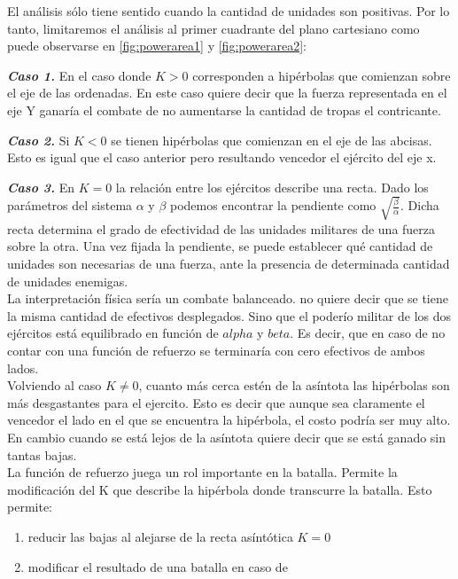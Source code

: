 \documentclass{sig-alternate}
\begin{document}
El an\'alisis s\'olo tiene sentido cuando la cantidad de unidades son positivas. Por lo tanto, limitaremos el an\'alisis al primer cuadrante del plano cartesiano como puede observarse en \ref{fig:powerarea1} y \ref{fig:powerarea2}:


\textbf{\textit{Caso 1.}} En el caso donde $K > 0$ corresponden a hip\'erbolas que comienzan
sobre el eje de las ordenadas. En este caso quiere decir que la fuerza representada
en el eje Y ganar\'ia el combate de no aumentarse la cantidad de tropas
el contricante.


\textbf{\textit{Caso 2.}} Si $K<0$ se tienen hip\'erbolas que comienzan
en el eje de las abcisas. Esto es igual que el caso anterior pero resultando vencedor el ejército del eje x.

\textbf{\textit{Caso 3.}} 
En $K=0$ la relación entre los ejércitos describe una recta. Dado los parámetros del sistema $\alpha$ y $\beta$ podemos encontrar la pendiente como $\sqrt{\frac{\beta}{\alpha}}$. Dicha recta determina el grado de efectividad de las unidades militares de una fuerza sobre la otra. Una vez fijada la pendiente, se puede 
establecer qué cantidad de unidades son necesarias de una fuerza, ante la presencia de determinada cantidad de unidades enemigas.  \\
La interpretación f\'isica ser\'ia un combate balanceado. no quiere decir que se tiene la misma cantidad de efectivos desplegados. Sino que el poderío militar de los dos ej\'ercitos está equilibrado en función de $alpha$ y $beta$. Es decir, que en caso de no contar con una funci\'on de refuerzo se terminar\'ia con cero efectivos de ambos lados. \\
Volviendo al caso $K \ne 0$, cuanto m\'as cerca est\'en de la as\'intota las hip\'erbolas son m\'as desgastantes para el ejercito. Esto es decir que aunque sea claramente
el vencedor el lado en el que se encuentra la hip\'erbola, el costo
podr\'ia ser muy alto. En cambio cuando se está lejos de la as\'intota
quiere decir que se está ganado sin tantas bajas. \\

La función de refuerzo juega un rol importante en la batalla. Permite la modificación del K que describe la hipérbola donde transcurre la batalla. Esto permite:
\begin{enumerate}
\item reducir las bajas al alejarse de la recta asíntótica $K=0$
\item modificar el resultado de una batalla en caso de
\end{enumerate}
\end{document}
